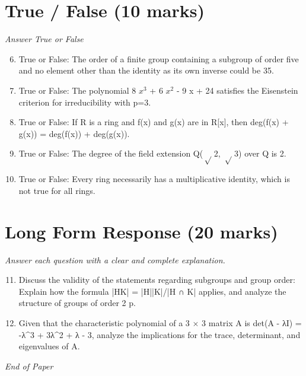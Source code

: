 \documentclass[12pt]{article}
\begin{document}
\section*{True / False (10 marks)}
\textit{Answer True or False}
\begin{enumerate}[label=\arabic*.]
\setcounter{enumi}{5}
\item True or False: The order of a finite group containing a subgroup of order five and no element other than the identity as its own inverse could be 35.
\item True or False: The polynomial 8 $x^3$ + 6 $x^2$ - 9 x + 24 satisfies the Eisenstein criterion for irreducibility with p=3.
\item True or False: If R is a ring and f(x) and g(x) are in R[x], then deg(f(x) + g(x)) = deg(f(x)) + deg(g(x)).
\item True or False: The degree of the field extension Q(\ensuremath{\sqrt} 2, \ensuremath{\sqrt} 3) over Q is 2.
\item True or False: Every ring necessarily has a multiplicative identity, which is not true for all rings.
\end{enumerate}

\section*{Long Form Response (20 marks)}
\textit{Answer each question with a clear and complete explanation.}
\begin{enumerate}[label=\arabic*.]
\setcounter{enumi}{10}
\item Discuss the validity of the statements regarding subgroups and group order: Explain how the formula |HK| = |H||K|/|H ∩ K| applies, and analyze the structure of groups of order 2 p.
\item Given that the characteristic polynomial of a 3 \ensuremath{\times} 3 matrix A is det(A - λI) = -λ^3 + 3λ^2 + λ - 3, analyze the implications for the trace, determinant, and eigenvalues of A.
\end{enumerate}

\vfill
\noindent\textit{End of Paper}
\end{document}

